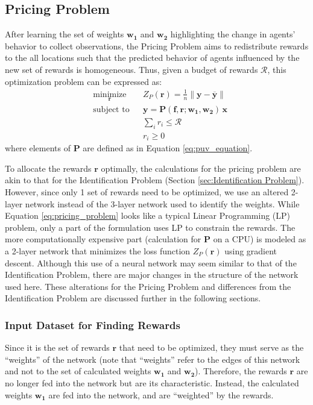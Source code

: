 \documentclass[12pt]{article}
\newcommand{\vect}[1]{\mathbf{#1}}  %
\newcommand{\matr}[1]{\mathbf{#1}}  %
\newcommand{\mean}[1]{\overline{#1}}    %
\begin{document}
    \subsection{Pricing Problem} \label{sec:Pricing Problem}
    After learning the set of weights $\matr{w_1}$ and $\matr{w_2}$ highlighting the change in agents' behavior to collect observations, the Pricing Problem aims to redistribute rewards to the all locations such that the predicted behavior of agents influenced by the new set of rewards is homogeneous. Thus, given a budget of rewards $\mathcal{R}$, this optimization problem can be expressed as:
    \begin{equation} \label{eq:pricing_problem}
        \begin{aligned}
            & \underset{\vect{r}}{\text{minimize}}
            & & Z_P(\vect{r}) = \frac{1}{n}\lVert \vect{y} - \mean{\vect{y}} \rVert\\
            & \text{subject to}
            & & \vect{y} = \matr{P}(\matr{f}, \vect{r}; \matr{w_1}, \matr{w_2}) \, \vect{x}\\
            &&& \sum_{i} r_i \leq \mathcal{R}\\
            &&& r_i \geq 0
        \end{aligned}
    \end{equation}
    where elements of $\matr{P}$ are defined as in Equation \ref{eq:puv_equation}.
    
    To allocate the rewards $\vect{r}$ optimally, the calculations for the pricing problem are akin to that for the Identification Problem (Section \ref{sec:Identification Problem}). However, since only 1 set of rewards need to be optimized, we use an altered 2-layer network instead of the 3-layer network used to identify the weights. While Equation \ref{eq:pricing_problem} looks like a typical Linear Programming (LP) problem, only a part of the formulation uses LP to constrain the rewards. The more computationally expensive part (calculation for $\matr{P}$ on a CPU) is modeled as a 2-layer network that minimizes the loss function $Z_P(\vect{r})$ using gradient descent. Although this use of a neural network may seem similar to that of the Identification Problem, there are major changes in the structure of the network used here. These alterations for the Pricing Problem and differences from the Identification Problem are discussed further in the following sections.
    
    \subsubsection{Input Dataset for Finding Rewards}
    Since it is the set of rewards $\vect{r}$ that need to be optimized, they must serve as the ``weights'' of the network (note that ``weights'' refer to the edges of this network and not to the set of calculated weights $\matr{w_1}$ and $\matr{w_2}$). Therefore, the rewards $\vect{r}$ are no longer fed into the network but are its characteristic. Instead, the calculated weights $\matr{w_1}$ are fed into the network, and are ``weighted'' by the rewards.
    
\end{document}

